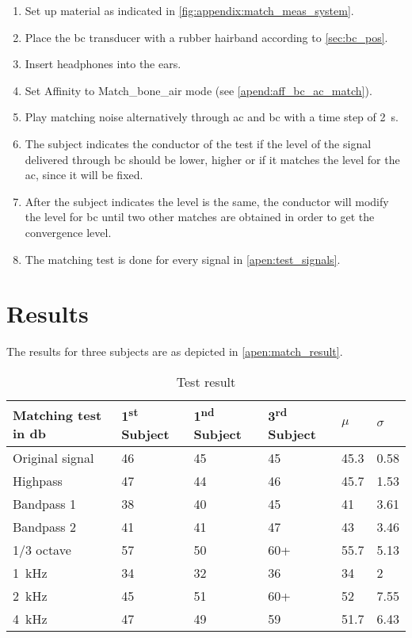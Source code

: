 \begin{enumerate}
\item Set up material as indicated in \autoref{fig:appendix:match_meas_system}.
\item Place the \gls{bc} transducer with a rubber hairband according to \autoref{sec:bc_pos}.
\item Insert headphones into the ears.
\item Set Affinity to Match_bone_air mode (see \autoref{apend:aff_bc_ac_match}).
\item Play matching noise alternatively through \gls{ac} and \gls{bc} with a time step of \SI{2}{\second}.
\item The  subject indicates the conductor of the test if the level of the signal delivered through \gls{bc} should be lower, higher or if it matches the level for the \gls{ac}, since it will be fixed.
\item After the subject indicates the level is the same, the conductor will modify the level for \gls{bc} until two other matches are obtained in order to get the convergence level.
\item The matching test is done for every signal in \autoref{apen:test_signals}.
\end{enumerate}

\section*{Results}

The results for three subjects are as depicted in \autoref{apen:match_result}. 

\begin{table}[H]
\centering
\caption{Test result}
\begin{tabular}{l|lll|ll}
Matching test in \si{\decibel}       & 1\textsuperscript{st}  Subject & 1\textsuperscript{nd}  Subject & 3\textsuperscript{rd}  Subject & $\mu$ & $\sigma$ \\ \hline
Original signal         & 46        & 45        & 45        & 45.3        & 0.58               \\
Highpass         & 47        & 44        & 46        & 45.7        & 1.53               \\
Bandpass 1         & 38        & 40        & 45        & 41          & 3.61               \\
Bandpass 2        & 41        & 41        & 47        & 43          & 3.46               \\
1/3 octave & 57        & 50        & 60+       & 55.7        & 5.13               \\
\SI{1}{\kilo\hertz}                   & 34        & 32        & 36        & 34          & 2                  \\
\SI{2}{\kilo\hertz}                  & 45        & 51        & 60+       & 52          & 7.55               \\
\SI{4}{\kilo\hertz}                  & 47        & 49        & 59        & 51.7        &  6.43                 
\end{tabular}
\label{apen:match_result}
\end{table}

